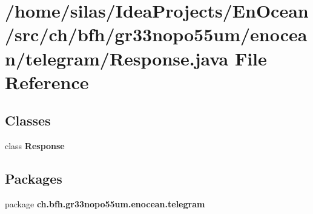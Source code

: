 \section{/home/silas/\+Idea\+Projects/\+En\+Ocean/src/ch/bfh/gr33nopo55um/enocean/telegram/\+Response.java File Reference}
\label{Response_8java}
\subsection*{Classes}
\begin{DoxyCompactItemize}
\item 
class {\bf Response}
\end{DoxyCompactItemize}
\subsection*{Packages}
\begin{DoxyCompactItemize}
\item 
package {\bf ch.\+bfh.\+gr33nopo55um.\+enocean.\+telegram}
\end{DoxyCompactItemize}
